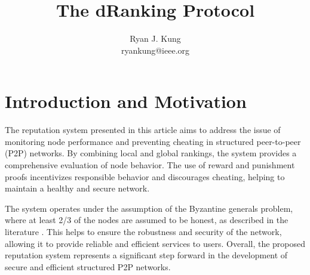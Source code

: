 \documentclass[twocolumn]{article}
\author{
  Ryan J. Kung \\ ryankung@ieee.org
}
\title{The dRanking Protocol}
\begin{document}

\section{Introduction and Motivation}
The reputation system presented in this article aims to address the issue of monitoring node performance and preventing cheating in structured peer-to-peer (P2P) networks. By combining local and global rankings, the system provides a comprehensive evaluation of node behavior. The use of reward and punishment proofs incentivizes responsible behavior and discourages cheating, helping to maintain a healthy and secure network.

The system operates under the assumption of the Byzantine generals problem, where at least 2/3 of the nodes are assumed to be honest, as described in the literature \cite{time}. This helps to ensure the robustness and security of the network, allowing it to provide reliable and efficient services to users. Overall, the proposed reputation system represents a significant step forward in the development of secure and efficient structured P2P networks.
\end{document}
